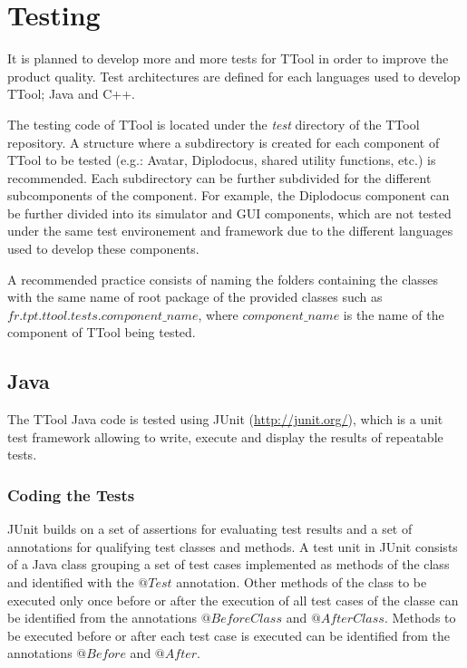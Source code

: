\documentclass[12pt]{article}
\begin{document}
\section{Testing}

It is planned to develop more and more tests for TTool in order to improve the
product quality. Test architectures are defined for each languages used to
develop TTool; Java and C++.

The testing code of TTool is located under the \textit{test} directory of the TTool
repository. A structure where a subdirectory is created for each
component of TTool to be tested (e.g.: Avatar, Diplodocus, shared utility
functions, etc.) is recommended. Each subdirectory can be further subdivided for
the different subcomponents of the component. For example, the Diplodocus component can be
further divided into its simulator and GUI components, which are not tested
under the same test environement and framework due to the different languages
used to develop these components.

A recommended practice consists of naming the folders containing the classes
with the same name of root package of the provided classes such as
$fr.tpt.ttool.tests.component\_name$, where $component\_name$ is the name of the
component of TTool being tested.

\subsection{Java}

The TTool Java code is tested using JUnit (\url{http://junit.org/}), which is a
unit test framework allowing to write, execute and display the results of
repeatable tests.

\subsubsection{Coding the Tests}

JUnit builds on a set of assertions for evaluating test results
and a set of annotations for qualifying test classes and methods. A test unit in
JUnit consists of a Java class grouping a set of test cases implemented as
methods of the class and identified with the $@Test$ annotation.
Other methods of the class to be executed only once before or after the
execution of all test cases of the classe can be identified from the annotations
$@BeforeClass$ and $@AfterClass$. Methods to be executed before or after each
test case is executed can be identified from the annotations $@Before$ and
$@After$.
\end{document}
